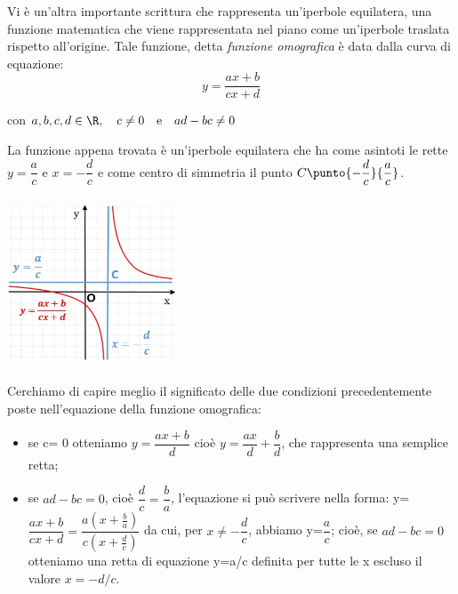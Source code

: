 \vspace{6pt}
\noindent\begin{minipage}{.6\textwidth}
Vi è un'altra importante scrittura che rappresenta un'iperbole 
equilatera, una funzione matematica che viene rappresentata nel piano come 
un'iperbole traslata rispetto all'origine.
Tale funzione, detta \emph{funzione omografica} è data dalla curva 
di equazione:
\begin{equation}
y= \dfrac{ax+b}{cx+d}
\end{equation}

con \(a,b,c,d\in \R,\quad c \neq 0 \quad \text{e} \quad ad-bc \neq 0\)

\vspace{6pt}
La funzione appena trovata è un'iperbole equilatera che ha come asintoti le 
rette $y= \dfrac{a}{c} $ e $x=-\dfrac{d}{c}$ e come centro di simmetria il 
punto \(C \punto{-\dfrac{d}{c}}{\dfrac{a}{c}}\).
\end{minipage}
\hfill
\begin{minipage}{.35\textwidth}
  \centering
  \includegraphics[height=5cm, width=5cm]{img/omografica.jpg}
\end{minipage}

\vspace{6pt}
Cerchiamo di capire meglio il significato delle due condizioni 
precedentemente poste nell'equazione della funzione omografica:

\begin{itemize} [noitemsep]
  \item se c= 0 otteniamo $y= \dfrac{ax+b}{d} $ cioè $y= 
\dfrac{ax}{d} + \dfrac{b}{d} $, che rappresenta una semplice retta;
  \item se $ad-bc=0$, cioè $ \dfrac{d}{c} = \dfrac{b}{a} $, 
l'equazione si può scrivere nella forma:
y= $\dfrac{ax+b}{cx+d}=  \dfrac{a\left(x+ \frac{b}{a} \right)}{c\left(x+ 
\frac{d}{c} \right)} $ da cui, per $x \neq -\dfrac{d}{c} $, abbiamo y=$ 
\dfrac{a}{c} $; cioè, se $ad-bc=0$ otteniamo una retta di equazione y=a/c 
definita per tutte le x escluso il valore $x=-d/c$.  
\end{itemize}


